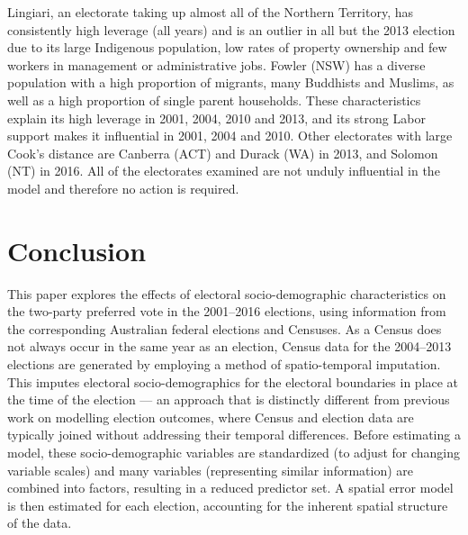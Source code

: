 \documentclass[times, doublespace]{anzsauth}
\begin{document}
Lingiari, an electorate taking up almost all of the Northern Territory, has consistently high leverage (all years) and is an outlier in all but the 2013 election due to its large Indigenous population, low rates of property ownership and few workers in management or administrative jobs. Fowler (NSW) has a diverse population with a high proportion of migrants, many Buddhists and Muslims, as well as a high proportion of single parent households. These characteristics explain its high leverage in 2001, 2004, 2010 and 2013, and its strong Labor support makes it influential in 2001, 2004 and 2010. Other electorates with large Cook's distance are Canberra (ACT) and Durack (WA) in 2013, and Solomon (NT) in 2016. All of the electorates examined are not unduly influential in the model and therefore no action is required.

\hypertarget{conclusion}{%
\section{Conclusion}\label{conclusion}}

This paper explores the effects of electoral socio-demographic characteristics on the two-party preferred vote in the 2001--2016 elections, using information from the corresponding Australian federal elections and Censuses. As a Census does not always occur in the same year as an election, Census data for the 2004--2013 elections are generated by employing a method of spatio-temporal imputation. This imputes electoral socio-demographics for the electoral boundaries in place at the time of the election --- an approach that is distinctly different from previous work on modelling election outcomes, where Census and election data are typically joined without addressing their temporal differences. Before estimating a model, these socio-demographic variables are standardized (to adjust for changing variable scales) and many variables (representing similar information) are combined into factors, resulting in a reduced predictor set. A spatial error model is then estimated for each election, accounting for the inherent spatial structure of the data.
\end{document}
